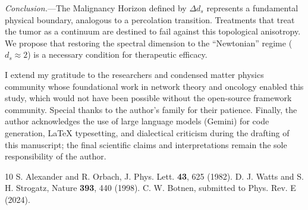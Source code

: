 \documentclass[aps,prl,twocolumn,superscriptaddress,showpacs,10pt]{revtex4-2}
\begin{document}
\textit{Conclusion.}---The Malignancy Horizon defined by $\Delta d_s$ represents a fundamental physical boundary, analogous to a percolation transition. Treatments that treat the tumor as a continuum are destined to fail against this topological anisotropy. We propose that restoring the spectral dimension to the ``Newtonian'' regime ($d_s \approx 2$) is a necessary condition for therapeutic efficacy.

\begin{acknowledgments}
I extend my gratitude to the researchers and condensed matter physics community whose foundational work in network theory and oncology enabled this study, which would not have been possible without the open-source framework community. Special thanks to the author's family for their patience. Finally, the author acknowledges the use of large language models (Gemini) for code generation, LaTeX typesetting, and dialectical criticism during the drafting of this manuscript; the final scientific claims and interpretations remain the sole responsibility of the author.
\end{acknowledgments}


\begin{thebibliography}{10}
 S. Alexander and R. Orbach, J. Phys. Lett. \textbf{43}, 625 (1982).
 D. J. Watts and S. H. Strogatz, Nature \textbf{393}, 440 (1998).
 C. W. Botnen, submitted to Phys. Rev. E (2024).
\end{thebibliography}
\end{document}
